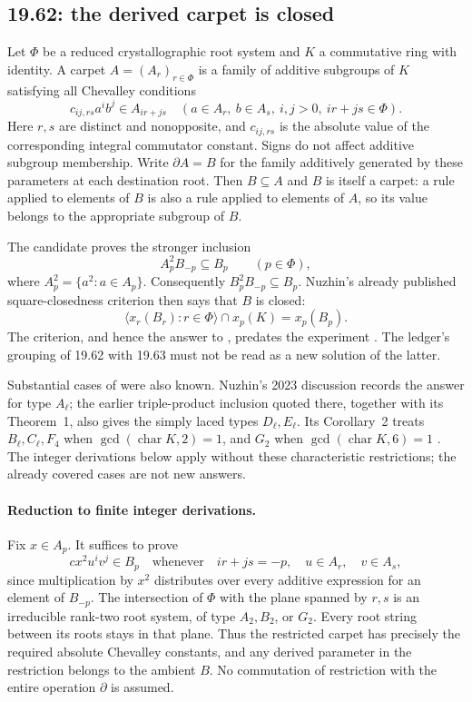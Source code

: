 \subsection{19.62: the derived carpet is closed}
\label{cand:19.62}

Let \(\Phi\) be a reduced crystallographic root system and \(K\) a
commutative ring with identity. A carpet \(A=(A_r)_{r\in\Phi}\) is a
family of additive subgroups of \(K\) satisfying all Chevalley conditions
\[
 c_{ij,rs}a^ib^j\in A_{ir+js}\quad
 (a\in A_r,\ b\in A_s,\ i,j>0,\ ir+js\in\Phi).
\]
Here \(r,s\) are distinct and nonopposite, and \(c_{ij,rs}\) is the
absolute value of the corresponding integral commutator constant.
Signs do not affect additive subgroup membership. Write
\(\partial A=B\) for the family additively generated by these
parameters at each destination root. Then \(B\subseteq A\) and \(B\)
is itself a carpet: a rule applied to elements of \(B\) is also a rule
applied to elements of \(A\), so its value belongs to the appropriate
subgroup of \(B\).

The candidate proves the stronger inclusion
\begin{equation}
 A_p^2B_{-p}\subseteq B_p \qquad(p\in\Phi),
 \label{eq:derived-square}
\end{equation}
where \(A_p^2=\{a^2:a\in A_p\}\). Consequently
\(B_p^2B_{-p}\subseteq B_p\). Nuzhin's already published
square-closedness criterion then says that \(B\) is closed:
\[
 \langle x_r(B_r):r\in\Phi\rangle\cap x_p(K)=x_p(B_p).
\]
The criterion, and hence the answer to , predates the
experiment \cite[Theorem~2]{nuzhin-2026}. The ledger's grouping of
19.62 with 19.63 must not be read as a new solution of the latter.

Substantial cases of  were also known. Nuzhin's 2023
discussion records the answer for type \(A_\ell\); the earlier
triple-product inclusion quoted there, together with its Theorem~1,
also gives the simply laced types \(D_\ell,E_\ell\).
Its Corollary~2 treats \(B_\ell,C_\ell,F_4\) when
\(\gcd(\operatorname{char}K,2)=1\), and \(G_2\) when
\(\gcd(\operatorname{char}K,6)=1\) \cite[Section~3]{nuzhin-2023}.
The integer derivations below apply without these characteristic
restrictions; the already covered cases are not new answers.

\paragraph{Reduction to finite integer derivations.}
Fix \(x\in A_p\). It suffices to prove
\[
 c x^2u^iv^j\in B_p
 \quad\text{whenever}\quad
 ir+js=-p,\quad u\in A_r,\quad v\in A_s,
 \tag{\(\ast\)}
\]
since multiplication by \(x^2\) distributes over every additive
expression for an element of \(B_{-p}\).
The intersection of \(\Phi\) with the plane spanned by \(r,s\) is an
irreducible rank-two root system, of type \(A_2,B_2\), or \(G_2\).
Every root string between its roots stays in that plane.
Thus the restricted carpet has precisely the required absolute
Chevalley constants, and any derived parameter in the restriction
belongs to the ambient \(B\). No commutation of restriction with
the entire operation \(\partial\) is assumed.

